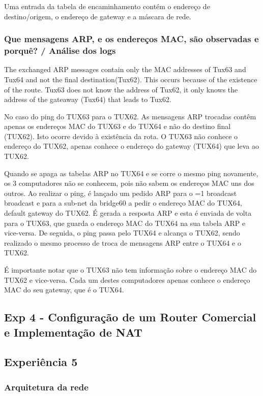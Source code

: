 \documentclass[11pt,a4paper,twocolumn]{article}
\newcommand{\hl}[2][1]{%
  \ifnum#1=1\relax
    \textcolor{text-hl1}{#2}%
  \else
    \textcolor{text-hl2}{#2}%
  \fi
}
\begin{document}
Uma entrada da tabela de encaminhamento contém o endereço de destino/origem, o endereço de gateway e a máscara de rede.

\subsubsection{ Que mensagens ARP, e os endereços MAC, são observadas e porquê? / Análise dos logs} 

The exchanged ARP messages contain only the MAC addresses of Tux63 and Tux64 and not the final destination(Tux62).
This occurs because of the existence of the route. 
Tux63 does not know the address of Tux62, it only knows the address of the gateaway (Tux64) that leads to Tux62.

No caso do ping do TUX63 para o TUX62. As mensagens ARP trocadas contêm apenas os endereços MAC do TUX63 e do TUX64 e não do destino final (TUX62). Isto ocorre devido à existência da rota. O TUX63 não conhece o endereço do TUX62, apenas conhece o endereço do gateway (TUX64) que leva ao TUX62.

Quando se apaga as tabelas ARP no TUX64 e se corre o mesmo ping novamente, os 3 computadores não se conhecem, pois não sabem os endereços MAC uns dos outros. Ao realizar o ping, é lançado um pedido ARP para o \hl{broadcast} e para a sub-net da bridge60 a pedir o endereço MAC do TUX64, default gateway do TUX62. É gerada a resposta ARP e esta é enviada de volta para o TUX63, que guarda o endereço MAC do TUX64 na sua tabela ARP e vice-versa. 
De seguida, o ping passa pelo TUX64 e alcança o TUX62, sendo realizado o mesmo processo de troca de mensagens ARP entre o TUX64 e o TUX62.

É importante notar que o TUX63 não tem informação sobre o endereço MAC do TUX62 e vice-versa. Cada um destes computadores apenas conhece o endereço MAC do seu gateway, que é o TUX64.




\subsection{Exp 4 - Configuração de um Router Comercial e Implementação de NAT}




\subsection{Experiência 5}

\subsubsection{Arquitetura da rede}
\end{document}
